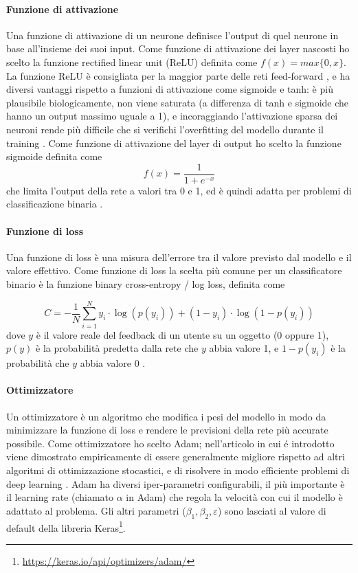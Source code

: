 \documentclass[12pt,italian]{report}
\begin{document}
\paragraph{Funzione di attivazione}
Una funzione di attivazione di un neurone definisce l'output di quel neurone in base all'insieme dei suoi input. Come funzione di attivazione dei layer nascosti ho scelto la funzione rectified linear unit (ReLU) definita come $f(x) = max\{0, x\}$. La funzione ReLU è consigliata per la maggior parte delle reti feed-forward \cite{Goodfellow-et-al-2016}, e ha diversi vantaggi rispetto a funzioni di attivazione come sigmoide e tanh: è più plausibile biologicamente, non viene saturata (a differenza di tanh e sigmoide che hanno un output massimo uguale a 1), e incoraggiando l'attivazione sparsa dei neuroni rende più difficile che si verifichi l'overfitting del modello durante il training \cite{relu}. Come funzione di attivazione del layer di output ho scelto la funzione sigmoide definita come 
$$f
(x) = \frac{1}{1+e^{-x}}
$$
che limita l'output della rete a valori tra 0 e 1, ed è quindi adatta per problemi di classificazione binaria \cite{choose-act-func}. 
\paragraph{Funzione di loss}
Una funzione di loss è una misura dell'errore tra il valore previsto dal modello e il valore effettivo. Come funzione di loss la scelta più comune per un classificatore binario è la funzione binary cross-entropy / log loss, definita come

$$
C = -\frac{1}{N} \sum_{i=1}^N y_i \cdot \log(p(y_i)) + (1-y_i) \cdot \log(1-p(y_i))
$$
dove $y$ è il valore reale del feedback di un utente su un oggetto (0 oppure 1), $p(y)$ è la probabilità predetta dalla rete che $y$ abbia valore 1, e $1-p(y_i)$ è la probabilità che $y$ abbia valore 0 \cite{cross-entropy}.

\paragraph{Ottimizzatore}
Un ottimizzatore è un algoritmo che modifica i pesi del modello in modo da minimizzare la funzione di loss e rendere le previsioni della rete più accurate possibile. Come ottimizzatore ho scelto Adam; nell'articolo in cui é introdotto viene dimostrato empiricamente di essere generalmente migliore rispetto ad altri algoritmi di ottimizzazione stocastici, e di risolvere in modo efficiente problemi di deep learning \cite{adam}. Adam ha diversi iper-parametri configurabili, il più importante è il learning rate (chiamato $\alpha$ in Adam) che regola la velocità con cui il modello è adattato al problema. Gli altri parametri ($\beta_1, \beta_2, \varepsilon$) sono lasciati al valore di default della libreria Keras\footnote{\url{https://keras.io/api/optimizers/adam/}}. 
\end{document}
